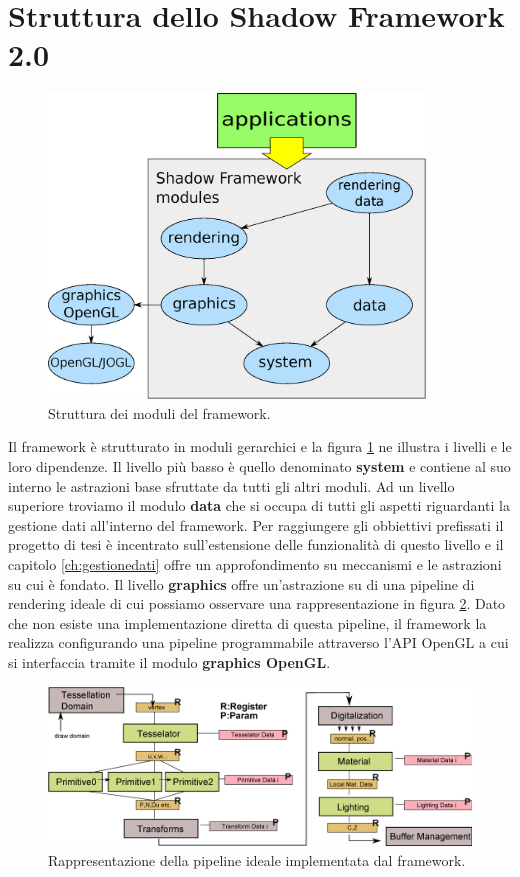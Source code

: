 \section{Struttura dello Shadow Framework 2.0}
\label{sec:sfstructure}
\begin{figure}
\begin{center}
\includegraphics[width=10cm]{Immagini/sfstructure}
\caption{Struttura dei moduli del framework.\label{f:sfstructure}} 
\end{center} 
\end{figure}
Il framework \`e strutturato in moduli gerarchici e la figura \ref{f:sfstructure} ne illustra i livelli e le loro dipendenze. Il livello pi\`u basso \`e quello denominato \textbf{system} e contiene al suo interno le astrazioni base sfruttate da tutti gli altri moduli. Ad un livello superiore troviamo il modulo \textbf{data} che si occupa di tutti gli aspetti riguardanti la gestione dati all'interno del framework. Per raggiungere gli obbiettivi prefissati il progetto di tesi \`e incentrato sull'estensione delle funzionalit\`a di questo livello e il capitolo \ref{ch:gestionedati} offre un approfondimento su meccanismi e le astrazioni su cui \`e fondato. Il livello \textbf{graphics} offre un'astrazione su di una pipeline di rendering ideale di cui possiamo osservare una rappresentazione in figura \ref{f:sfpipeline}. Dato che non esiste una implementazione diretta di questa pipeline, il framework la realizza configurando una pipeline programmabile attraverso l'\ac{API} OpenGL a cui si interfaccia tramite il modulo \textbf{graphics OpenGL}.
\begin{figure}
\begin{center}
\includegraphics[width=\textwidth]{Immagini/Pipeline}
\caption[Pipeline implementata dal framework.]{Rappresentazione della pipeline ideale implementata dal framework.\label{f:sfpipeline}} 
\end{center} 
\end{figure}
